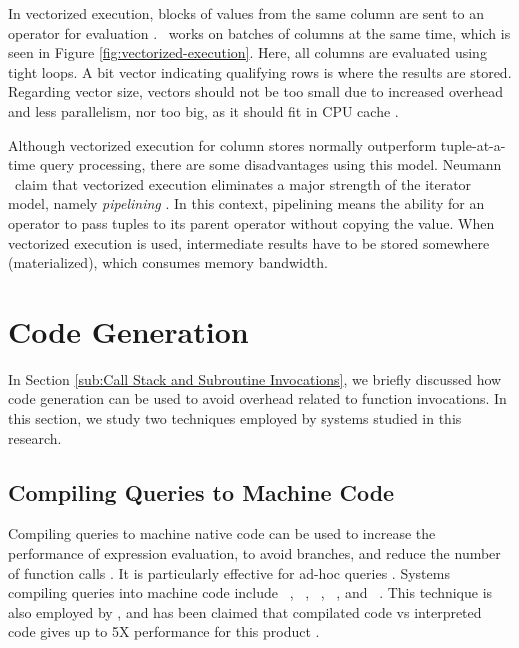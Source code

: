 In vectorized execution, blocks of values from the same column are sent to an operator for evaluation \cite{Zukowski2006-oz}. \mssql~works on batches of columns at the same time, which is seen in Figure \ref{fig:vectorized-execution}. Here, all columns are evaluated using tight loops. A bit vector indicating qualifying rows is where the results are stored. Regarding vector size, vectors should not be too small due to increased overhead and less parallelism, nor too big, as it should fit in CPU cache \cite{Boncz2005-wj}.

Although vectorized execution for column stores normally outperform tuple-at-a-time query processing, there are some disadvantages using this model. Neumann \ea~claim that vectorized execution eliminates a major strength of the iterator model, namely \textit{pipelining} \cite{Neumann2011-uq}. In this context, pipelining means the ability for an operator to pass tuples to its parent operator without copying the value. When vectorized execution is used, intermediate results have to be stored somewhere (materialized), which consumes memory bandwidth.

\section{Code Generation}
\label{sec:Code Generation}
In Section \ref{sub:Call Stack and Subroutine Invocations}, we briefly discussed how code generation can be used to avoid overhead related to function invocations. In this section, we study two techniques employed by systems studied in this research.


\subsection{Compiling Queries to Machine Code}
\label{sub:Compiling Queries to Machine Code}
Compiling queries to machine native code can be used to increase the performance of expression evaluation, to avoid branches, and reduce the number of function calls \cite{Lamb2012-kg, Neumann2011-uq}. It is particularly effective for ad-hoc queries \cite{Psaroudakis2014}. Systems compiling queries into machine code include \blink~\cite{Barber2012-xt}, \ibm~\cite{Raman2013-em}, \vertica~\cite{Lamb2012-kg}, \hyper~\cite{Psaroudakis2014-ma}, and \mssql~\cite{Delaney2014-ip}. This technique is also employed by \qlikview, and has been claimed that compilated code vs interpreted code gives up to 5X performance for this product \cite{noauthor_undated-js}.

